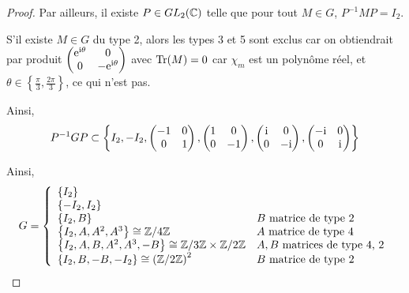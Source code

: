 \documentclass[12pt]{article}
\begin{document}
\begin{proof}
	Par ailleurs, il existe $P\in GL_{2}(\mathbb{C})$ telle que pour tout $M\in G$, $P^{-1}MP=I_{2}$.

	S'il existe $M\in G$ du type 2, alors les types 3 et 5 sont exclus car on obtiendrait par produit $\begin{pmatrix}
		\mathrm{e}^{\mathrm{i}\theta}&0\\0&-\mathrm{e}^{\mathrm{i}\theta}
	\end{pmatrix}$ avec $\operatorname{Tr}(M)=0$ car $\chi_{m}$ est un polynôme réel, et $\theta\in\left\lbrace\frac{\pi}{3},\frac{2\pi}{3}\right\rbrace$, ce qui n'est pas.

	Ainsi, 
	\begin{equation}
		P^{-1}GP\subset\left\lbrace I_{2},-I_{2},\begin{pmatrix}
			-1&0\\0&1
		\end{pmatrix},\begin{pmatrix}
			1&0\\0&-1
		\end{pmatrix},\begin{pmatrix}
			\mathrm{i}&0\\0&-\mathrm{i}
		\end{pmatrix},\begin{pmatrix}
			-\mathrm{i}&0\\0&\mathrm{i}
		\end{pmatrix}\right\rbrace
	\end{equation}

	Ainsi, 
	\begin{equation}
		G=
		\left\lbrace
			\begin{array}[]{ll}
				\left\lbrace I_{2}\right\rbrace\\
				\left\lbrace -I_{2},I_{2}\right\rbrace\\
				\left\lbrace I_{2},B\right\rbrace& B\text{ matrice de type 2}\\
				\left\lbrace I_{2}, A,A^{2},A^{3}\right\rbrace\cong\Z/4\Z& A\text{ matrice de type 4}\\
				\left\lbrace I_{2},A,B,A^{2},A^{3},-B\right\rbrace\cong \Z/3\Z\times\Z/2\Z& A,B\text{ matrices de type 4, 2}\\
				\left\lbrace I_{2},B,-B,-I_{2}\right\rbrace\cong\left(\Z/2\Z\right)^{2} & B\text{ matrice de type 2}
			\end{array}
		\right.
	\end{equation}


\end{proof}
\end{document}
